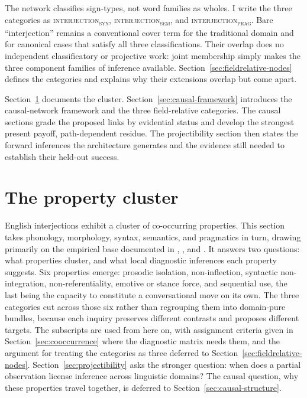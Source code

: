 \documentclass[12pt]{article}
\newcommand{\intj}[1]{\textsc{interjection\textsubscript{#1}}}
\begin{document}
The network classifies sign-types, not word families as wholes. I write the
three categories as \intj{syn}, \intj{sem}, and \intj{prag}. Bare
\enquote{interjection} remains a conventional cover term for the traditional
domain and for canonical cases that satisfy all three classifications. Their
overlap does no independent classificatory or projective work: joint
membership simply makes the three component families of inference available.
Section~\ref{sec:fieldrelative-nodes} defines the categories and explains why
their extensions overlap but come apart.

Section~\ref{sec:cluster} documents the cluster.
Section~\ref{sec:causal-framework} introduces the causal-network
framework and the three field-relative categories. The causal sections grade
the proposed links by evidential status and develop the strongest present
payoff, path-dependent residue. The projectibility section then states the
forward inferences the architecture generates and the evidence still needed
to establish their held-out success.

\section{The property cluster}\label{sec:cluster}

English interjections exhibit a cluster of co-occurring properties. This
section takes phonology, morphology, syntax, semantics, and pragmatics in turn,
drawing primarily on the empirical base documented in \textcite{ameka1992},
\textcite{quirk1985}, and \textcite{HuddlestonPullum2002}. It answers two
questions: what properties cluster, and what local diagnostic inferences each
property suggests. Six properties emerge: prosodic isolation,
non-inflection, syntactic non-integration, non-referentiality, emotive or
stance force, and sequential use, the last being the capacity to constitute a
conversational move on its own. The three categories cut across those six
rather than regrouping them into domain-pure bundles, because each inquiry
preserves different contrasts and proposes different targets. The subscripts
are used from here on, with assignment criteria given in
Section~\ref{sec:cooccurrence} where the diagnostic matrix needs them, and
the argument for treating the categories as three deferred to
Section~\ref{sec:fieldrelative-nodes}. Section~\ref{sec:projectibility} asks
the stronger question: when does a partial observation license inference
across linguistic domains? The causal question, why these properties
travel together, is deferred to Section~\ref{sec:causal-structure}.
\end{document}
